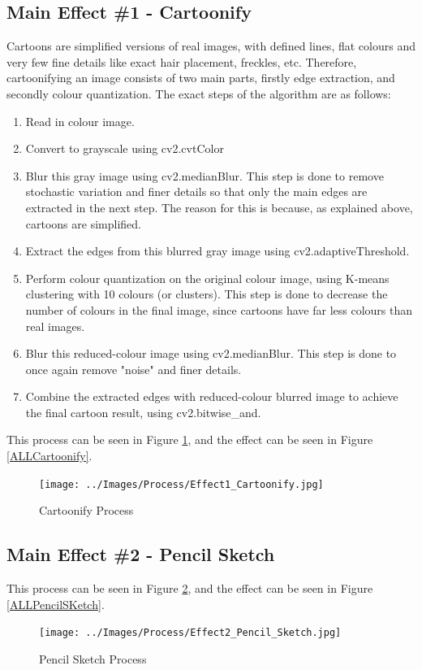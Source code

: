 \documentclass[a4paper,10pt]{report}
\begin{document}
	\subsection{Main Effect \#1 - Cartoonify}
	Cartoons are simplified versions of real images, with defined lines, flat colours and very few fine details like exact hair placement, freckles, etc. Therefore, cartoonifying an image consists of two main parts, firstly edge extraction, and secondly colour quantization.
	The exact steps of the algorithm are as follows:
	\begin{enumerate}[Step 1:]
		\item Read in colour image.
		\item Convert to grayscale using cv2.cvtColor
		\item Blur this gray image using cv2.medianBlur. This step is done to remove stochastic variation and finer details so that only the main edges are extracted in the next step. The reason for this is because, as explained above, cartoons are simplified.
		\item Extract the edges from this blurred gray image using cv2.adaptiveThreshold.
		\item Perform colour quantization on the original colour image, using K-means clustering with 10 colours (or clusters). This step is done to decrease the number of colours in the final image, since cartoons have far less colours than real images.
		\item Blur this reduced-colour image using cv2.medianBlur. This step is done to once again remove "noise" and finer details.
		\item Combine the extracted edges with reduced-colour blurred image to achieve the final cartoon result, using cv2.bitwise\_and.		
	\end{enumerate}
	This process can be seen in Figure \ref{Process_Cartoonify}, and the effect can be seen in Figure \ref{ALLCartoonify}.
	
	\begin{figure}[h]
		\caption{Cartoonify Process}
		\centering
		\texttt{[image: ../Images/Process/Effect1\_Cartoonify.jpg]}
		\label{Process_Cartoonify}
	\end{figure}
	
	
	\subsection{Main Effect \#2 - Pencil Sketch}
	This process can be seen in Figure \ref{Process_Pencil_Sketch}, and the effect can be seen in Figure \ref{ALLPencilSKetch}.
	\begin{figure}[h]
		\caption{Pencil Sketch Process}
		\centering
		\texttt{[image: ../Images/Process/Effect2\_Pencil\_Sketch.jpg]}
		\label{Process_Pencil_Sketch}
	\end{figure}
	
\end{document}
